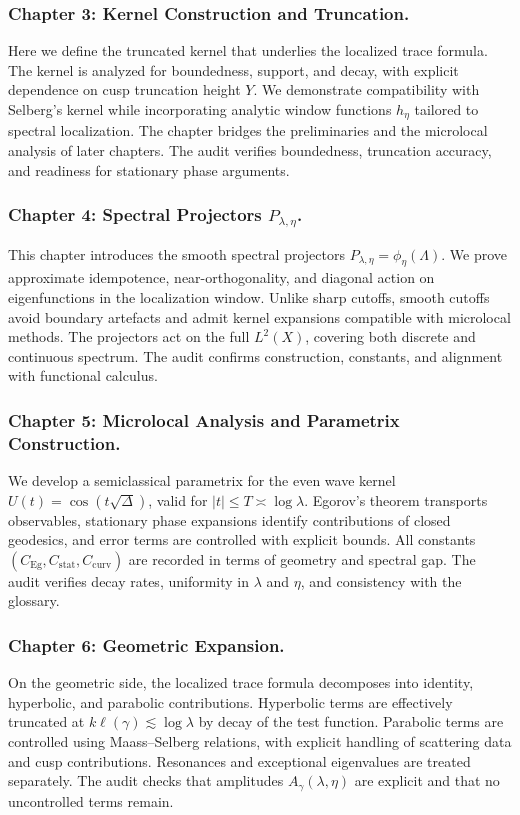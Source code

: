 \subsubsection*{Chapter 3: Kernel Construction and Truncation.}
Here we define the truncated kernel that underlies the localized trace formula.
The kernel is analyzed for boundedness, support, and decay,
with explicit dependence on cusp truncation height $Y$.
We demonstrate compatibility with Selberg’s kernel
while incorporating analytic window functions $h_\eta$ tailored to spectral localization.
The chapter bridges the preliminaries and the microlocal analysis of later chapters.
The audit verifies boundedness, truncation accuracy,
and readiness for stationary phase arguments.

\subsubsection*{Chapter 4: Spectral Projectors $P_{\lambda,\eta}$.}
This chapter introduces the smooth spectral projectors $P_{\lambda,\eta}=\phi_\eta(\Lambda)$.
We prove approximate idempotence, near-orthogonality,
and diagonal action on eigenfunctions in the localization window.
Unlike sharp cutoffs, smooth cutoffs avoid boundary artefacts
and admit kernel expansions compatible with microlocal methods.
The projectors act on the full $L^2(X)$, covering both discrete and continuous spectrum.
The audit confirms construction, constants, and alignment with functional calculus.

\subsubsection*{Chapter 5: Microlocal Analysis and Parametrix Construction.}
We develop a semiclassical parametrix for the even wave kernel $U(t)=\cos(t\sqrt{\Delta})$,
valid for $|t|\le T\asymp\log\lambda$.
Egorov’s theorem transports observables,
stationary phase expansions identify contributions of closed geodesics,
and error terms are controlled with explicit bounds.
All constants $(C_{\mathrm{Eg}},C_{\mathrm{stat}},C_{\mathrm{curv}})$
are recorded in terms of geometry and spectral gap.
The audit verifies decay rates, uniformity in $\lambda$ and $\eta$,
and consistency with the glossary.

\subsubsection*{Chapter 6: Geometric Expansion.}
On the geometric side,
the localized trace formula decomposes into identity, hyperbolic, and parabolic contributions.
Hyperbolic terms are effectively truncated at $k\ell(\gamma)\lesssim \log\lambda$
by decay of the test function.
Parabolic terms are controlled using Maass–Selberg relations,
with explicit handling of scattering data and cusp contributions.
Resonances and exceptional eigenvalues are treated separately.
The audit checks that amplitudes $A_\gamma(\lambda,\eta)$ are explicit
and that no uncontrolled terms remain.

